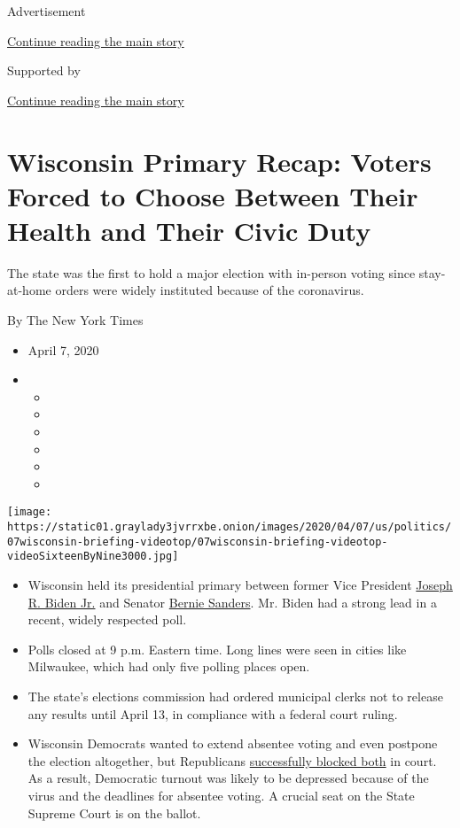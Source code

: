 Advertisement

\protect\hyperlink{after-top}{Continue reading the main story}

Supported by

\protect\hyperlink{after-sponsor}{Continue reading the main story}

\hypertarget{wisconsin-primary-recap-voters-forced-to-choose-between-their-health-and-their-civic-duty}{%
\section{Wisconsin Primary Recap: Voters Forced to Choose Between Their
Health and Their Civic
Duty}\label{wisconsin-primary-recap-voters-forced-to-choose-between-their-health-and-their-civic-duty}}

The state was the first to hold a major election with in-person voting
since stay-at-home orders were widely instituted because of the
coronavirus.

By The New York Times

\begin{itemize}
\item
  April 7, 2020
\item
  \begin{itemize}
  \item
  \item
  \item
  \item
  \item
  \item
  \end{itemize}
\end{itemize}

\texttt{[image: https://static01.graylady3jvrrxbe.onion/images/2020/04/07/us/politics/07wisconsin-briefing-videotop/07wisconsin-briefing-videotop-videoSixteenByNine3000.jpg]}

\begin{itemize}
\item
  Wisconsin held its presidential primary between former Vice President
  \href{https://www.nytimes3xbfgragh.onion/interactive/2020/us/elections/joe-biden.html}{Joseph
  R. Biden Jr.} and Senator
  \href{https://www.nytimes3xbfgragh.onion/interactive/2020/us/elections/bernie-sanders.html}{Bernie
  Sanders}. Mr. Biden had a strong lead in a recent, widely respected
  poll.
\item
  Polls closed at 9 p.m. Eastern time. Long lines were seen in cities
  like Milwaukee, which had only five polling places open.
\item
  The state's elections commission had ordered municipal clerks not to
  release any results until April 13, in compliance with a federal court
  ruling.
\item
  Wisconsin Democrats wanted to extend absentee voting and even postpone
  the election altogether, but Republicans
  \href{https://www.nytimes3xbfgragh.onion/2020/04/06/us/politics/wisconsin-primary-voting-coronavirus.html}{successfully
  blocked both} in court. As a result, Democratic turnout was likely to
  be depressed because of the virus and the deadlines for absentee
  voting. A crucial seat on the State Supreme Court is on the ballot.
\end{itemize}

